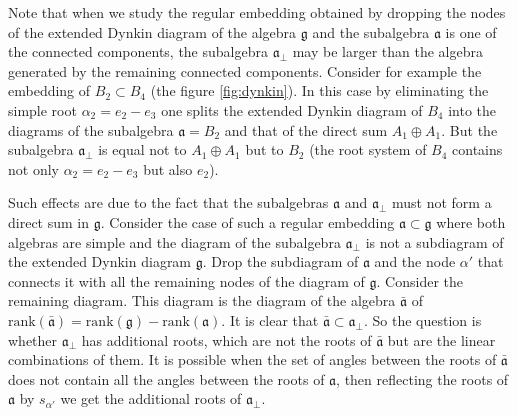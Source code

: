 \documentclass[a4paper,12pt]{article}
\theoremstyle{definition} \newtheorem{Def}{Definition}
\begin{document}
Note that when we study the regular embedding obtained by dropping the nodes
of the extended Dynkin diagram of the algebra $\mathfrak{g}$ and the
subalgebra $\mathfrak{a}$ is one of the connected components,
the subalgebra $\mathfrak{a}_{\bot}$ may be larger than the algebra
generated by the remaining connected components.
Consider for example the embedding of $B_2\subset B_4$ (the figure \ref{fig:dynkin}).
In this case by eliminating
the simple root $\alpha_2=e_2-e_3$ one splits the extended Dynkin diagram of $B_4$
into the diagrams of the subalgebra $\mathfrak{a}=B_2$ and that of the direct
sum $A_1 \oplus A_1 $. But the subalgebra $\mathfrak{a}_{\bot}$ is equal not to
$A_1\oplus A_1$ but to $B_2$ (the root system of $B_4$ contains not only $\alpha_2=e_2-e_3$ but also $e_2$).

Such effects are due to the fact that the subalgebras $\mathfrak{a}$ and $\mathfrak{a}_{\bot}$ must not form a direct sum in $\mathfrak{g}$.  
Consider the case of such a regular embedding $\mathfrak{a}\subset \mathfrak{g}$ where both algebras are simple and the diagram of the subalgebra $\mathfrak{a}_{\bot}$ is not a subdiagram of the extended Dynkin diagram $\mathfrak{g}$.
 Drop the subdiagram of $\mathfrak{a}$ and the node $\alpha'$ that connects it with all the remaining nodes of the diagram of $\mathfrak{g}$. Consider the remaining diagram. This diagram is the diagram of the algebra $\mathfrak{\bar{a}}$ of $\mathrm{rank}(\mathfrak{\bar{a}}) = \mathrm{rank}(\mathfrak{g})-\mathrm{rank}(\mathfrak{a})$. It is clear that $\mathfrak{\bar{a}}\subset \mathfrak{a}_{\bot}$. So the question is whether $\mathfrak{a}_{\bot}$ has additional roots, which are not the roots of $\mathfrak{\bar{a}}$ but are the linear combinations of them. It is possible when the set of angles between the roots of $\mathfrak{\bar{a}}$ does not contain all the angles between the roots of $\mathfrak{a}$, then reflecting the roots of $\mathfrak{a}$ by $s_{\alpha'}$ we get the additional roots of $\mathfrak{a}_{\bot}$.
\end{document}

